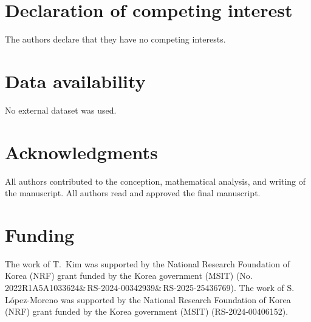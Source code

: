 \documentclass[pdflatex,sn-mathphys-ay]{sn-jnl}
\theoremstyle{thmstyleone}
\theoremstyle{thmstyletwo}
\theoremstyle{thmstylethree}
\numberwithin{equation}{section}
\begin{document}
\section*{ Declaration of competing interest}
The authors declare that they have no competing interests.

\section*{ Data availability}
No external dataset was used.

\section*{ Acknowledgments}
All authors contributed to the conception, mathematical analysis, and writing of the manuscript. All authors read and approved the final manuscript.

\section*{ Funding}

The work of T.~Kim was supported by the National Research Foundation of Korea (NRF) grant funded by the Korea government (MSIT) (No. 2022R1A5A1033624\&\,RS-2024-00342939\&\,RS-2025-25436769). 
The work of S. L\'opez-Moreno was supported by the National Research Foundation of Korea (NRF) grant funded by the Korea government (MSIT) (RS-2024-00406152).



\end{document}
